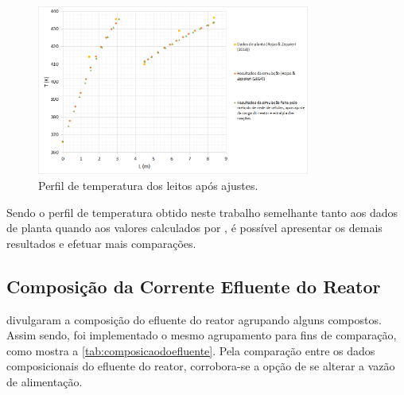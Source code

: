 \begin{figure}[htb]
\centering \includegraphics[width=0.8\textwidth]{images/Chap4/perfilT2.png}
\caption{Perfil de temperatura dos leitos após ajustes.}
\label{fig:perfilT2}
\end{figure}

Sendo o perfil de temperatura obtido neste trabalho semelhante tanto aos dados
de planta quando aos valores calculados por , é possível
apresentar os demais resultados e efetuar mais comparações.

\subsection{Composição da Corrente Efluente do Reator}
\label{composicaodacorrenteefluentedoreator}

 divulgaram a composição do efluente do reator agrupando
alguns compostos. Assim sendo, foi implementado o mesmo agrupamento para fins de
comparação, como mostra a \autoref{tab:composicaodoefluente}. Pela comparação
entre os dados composicionais do efluente do reator, corrobora-se a opção de se
alterar a vazão de alimentação.

